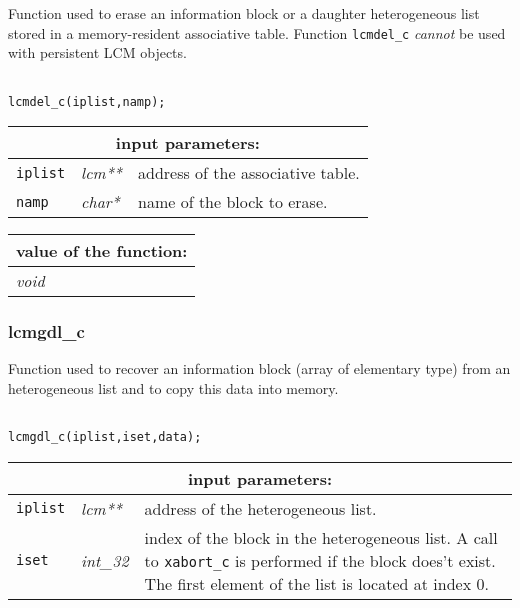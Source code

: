 Function used to erase an information block or a daughter heterogeneous list stored in a memory-resident associative table.
Function {\tt lcmdel\_c} {\sl cannot} be used with persistent LCM objects.

\begin{verbatim}

lcmdel_c(iplist,namp);
\end{verbatim}

\noindent
\begin{tabular}{|p{1.5cm}|p{2cm}|p{11cm}|}
\hline
\multicolumn{3}{|c|}{\bf input parameters:} \\
\hline
{\tt iplist} & {\it lcm**} & address of the associative table. \\
\hline
{\tt namp} & {\it char*} & name of the block to erase. \\
\hline
\end{tabular}

\vskip 0.8cm

\noindent
\begin{tabular}{|p{4.0cm}|p{11cm}|}
\hline
\multicolumn{2}{|c|}{\bf value of the function:} \\
\hline
{\it void} &  \\
\hline
\end{tabular}

\subsubsection{lcmgdl\_c}

Function used to recover an information block (array of elementary type) from an heterogeneous list and to copy
this data into memory.

\begin{verbatim}

lcmgdl_c(iplist,iset,data);
\end{verbatim}

\noindent
\begin{tabular}{|p{1.5cm}|p{2cm}|p{11cm}|}
\hline
\multicolumn{3}{|c|}{\bf input parameters:} \\
\hline
{\tt iplist} & {\it lcm**} & address of the heterogeneous list. \\
\hline
{\tt iset} & {\it int\_32} & index of the block in the heterogeneous list. A call to {\tt xabort\_c} 
                                   is performed if the block does't exist.
The first element of the list is located at index $0$. \\
\hline
\end{tabular}

